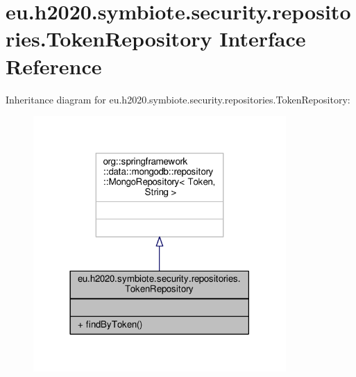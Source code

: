 \hypertarget{interfaceeu_1_1h2020_1_1symbiote_1_1security_1_1repositories_1_1TokenRepository}{}\section{eu.\+h2020.\+symbiote.\+security.\+repositories.\+Token\+Repository Interface Reference}
\label{interfaceeu_1_1h2020_1_1symbiote_1_1security_1_1repositories_1_1TokenRepository}


Inheritance diagram for eu.\+h2020.\+symbiote.\+security.\+repositories.\+Token\+Repository\+:
\nopagebreak
\begin{figure}[H]
\begin{center}
\leavevmode
\includegraphics[width=273pt]{interfaceeu_1_1h2020_1_1symbiote_1_1security_1_1repositories_1_1TokenRepository__inherit__graph}
\end{center}
\end{figure}


